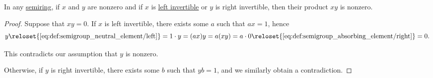 \begin{proposition}\label{thm:semiring_nonzero_product}
  In any \hyperref[def:semiring]{semiring}, if \( x \) and \( y \) are nonzero and if \( x \) is \hyperref[def:semiring_divisibility/invertible]{left invertible} or \( y \) is right invertible, then their product \( xy \) is nonzero.
\end{proposition}
\begin{proof}
  Suppose that \( xy = 0 \). If \( x \) is left invertible, there exists some \( a \) such that \( ax = 1 \), hence
  \begin{equation*}
    y
    \reloset {\eqref{eq:def:semigroup_neutral_element/left}} =
    1 \cdot y
    =
    (ax)y
    =
    a(xy)
    =
    a \cdot 0
    \reloset {\eqref{eq:def:semigroup_absorbing_element/right}} =
    0.
  \end{equation*}

  This contradicts our assumption that \( y \) is nonzero.

  Otherwise, if \( y \) is right invertible, there exists some \( b \) such that \( yb = 1 \), and we similarly obtain a contradiction.
\end{proof}

